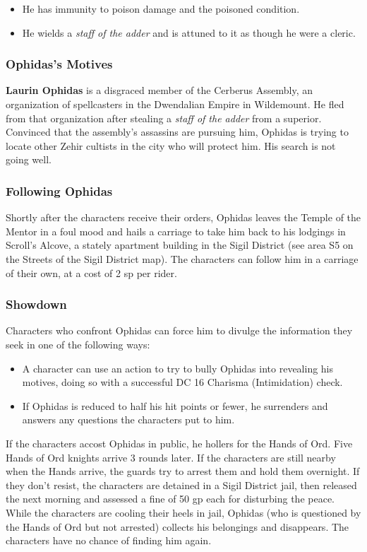 \documentclass[10pt,a4paper,twoside,fancy,bg=print,twocolumn,openany,nodeprecatedcode]{dndbook}
\begin{document}
\begin{itemize}
\item He has immunity to poison damage and the poisoned condition.
\item He wields a \textit{staff of the adder} and is attuned to it as though he were a cleric.
\end{itemize}

\subsubsection{Ophidas's Motives}
\textbf{Laurin Ophidas} is a disgraced member of the Cerberus Assembly, an organization of spellcasters in the Dwendalian Empire in Wildemount. He fled from that organization after stealing a \textit{staff of the adder} from a superior. Convinced that the assembly's assassins are pursuing him, Ophidas is trying to locate other Zehir cultists in the city who will protect him. His search is not going well.

\subsubsection{Following Ophidas}
Shortly after the characters receive their orders, Ophidas leaves the Temple of the Mentor in a foul mood and hails a carriage to take him back to his lodgings in Scroll's Alcove, a stately apartment building in the Sigil District (see area S5 on the Streets of the Sigil District map). The characters can follow him in a carriage of their own, at a cost of 2 sp per rider.

\subsubsection{Showdown}
Characters who confront Ophidas can force him to divulge the information they seek in one of the following ways:


\begin{itemize}
\item A character can use an action to try to bully Ophidas into revealing his motives, doing so with a successful DC 16 Charisma (Intimidation) check.
\item If Ophidas is reduced to half his hit points or fewer, he surrenders and answers any questions the characters put to him.
\end{itemize}

If the characters accost Ophidas in public, he hollers for the Hands of Ord. Five Hands of Ord knights arrive 3 rounds later. If the characters are still nearby when the Hands arrive, the guards try to arrest them and hold them overnight. If they don't resist, the characters are detained in a Sigil District jail, then released the next morning and assessed a fine of 50 gp each for disturbing the peace. While the characters are cooling their heels in jail, Ophidas (who is questioned by the Hands of Ord but not arrested) collects his belongings and disappears. The characters have no chance of finding him again.
\end{document}
